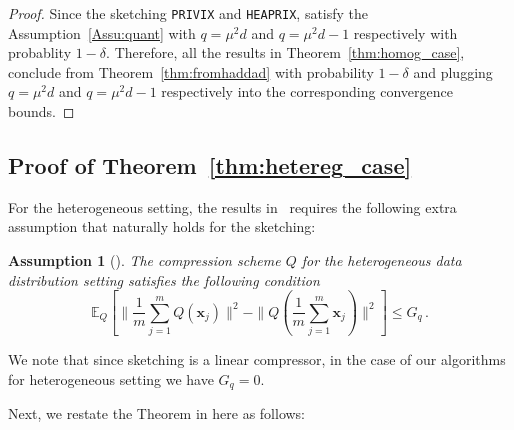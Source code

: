 \documentclass[review,onefignum,onetabnum]{siamart190516}
\newtheorem{assumption}{Assumption}
\begin{document}
\begin{proof}
Since the sketching \texttt{PRIVIX} and \texttt{HEAPRIX}, satisfy the Assumption~\ref{Assu:quant} with $q=\mu^2d$ and $q=\mu^2d-1$ respectively with probablity $1-\delta$.  Therefore, all the results in Theorem~\ref{thm:homog_case}, conclude from Theorem~\ref{thm:fromhaddad} with probability $1-\delta$ and plugging $q=\mu^2d$ and $q=\mu^2d-1$ respectively into the corresponding convergence bounds.
\end{proof}


\subsection{Proof of Theorem~\ref{thm:hetereg_case}}
For the heterogeneous setting, the results in~\cite{haddadpour2020federated} requires the following extra assumption that naturally holds for the sketching: 

\begin{assumption}[\cite{haddadpour2020federated}]\label{assum:009}
The compression scheme $Q$ for the heterogeneous data distribution setting satisfies the following condition 
$$\mathbb{E}_Q[\|\frac{1}{m}\sum_{j=1}^m Q(\boldsymbol{x}_j)\|^2-\|Q(\frac{1}{m}\sum_{j=1}^m \boldsymbol{x}_j)\|^2]\leq G_q \, .$$
\end{assumption}
We note that since sketching is a linear compressor, in the case of our algorithms for heterogeneous setting we have $G_q=0$. 

Next, we restate the Theorem in \cite{haddadpour2020federated} here as follows:
\end{document}
